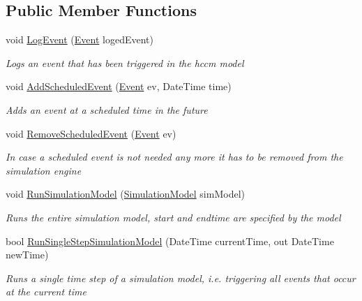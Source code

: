 \subsection*{Public Member Functions}
\begin{DoxyCompactItemize}
\item 
void \hyperlink{interface_simulation_core_1_1_simulation_classes_1_1_i_simulation_engine_ae0b31d5f47f704d3d76f9ac829292a55}{Log\+Event} (\hyperlink{class_simulation_core_1_1_h_c_c_m_elements_1_1_event}{Event} loged\+Event)
\begin{DoxyCompactList}\small\item\em Logs an event that has been triggered in the hccm model \end{DoxyCompactList}\item 
void \hyperlink{interface_simulation_core_1_1_simulation_classes_1_1_i_simulation_engine_af7f58b11d21551db60638953010fbb40}{Add\+Scheduled\+Event} (\hyperlink{class_simulation_core_1_1_h_c_c_m_elements_1_1_event}{Event} ev, Date\+Time time)
\begin{DoxyCompactList}\small\item\em Adds an event at a scheduled time in the future \end{DoxyCompactList}\item 
void \hyperlink{interface_simulation_core_1_1_simulation_classes_1_1_i_simulation_engine_a31f7755f3878cc18dbb69f5850cea808}{Remove\+Scheduled\+Event} (\hyperlink{class_simulation_core_1_1_h_c_c_m_elements_1_1_event}{Event} ev)
\begin{DoxyCompactList}\small\item\em In case a scheduled event is not needed any more it has to be removed from the simulation engine \end{DoxyCompactList}\item 
void \hyperlink{interface_simulation_core_1_1_simulation_classes_1_1_i_simulation_engine_af442c66df0e2ea0fd590cc88b3110e3a}{Run\+Simulation\+Model} (\hyperlink{class_simulation_core_1_1_simulation_classes_1_1_simulation_model}{Simulation\+Model} sim\+Model)
\begin{DoxyCompactList}\small\item\em Runs the entire simulation model, start and endtime are specified by the model \end{DoxyCompactList}\item 
bool \hyperlink{interface_simulation_core_1_1_simulation_classes_1_1_i_simulation_engine_ada406e84c3569fef29a9bf191ea5d832}{Run\+Single\+Step\+Simulation\+Model} (Date\+Time current\+Time, out Date\+Time new\+Time)
\begin{DoxyCompactList}\small\item\em Runs a single time step of a simulation model, i.\+e. triggering all events that occur at the current time \end{DoxyCompactList}\end{DoxyCompactItemize}


